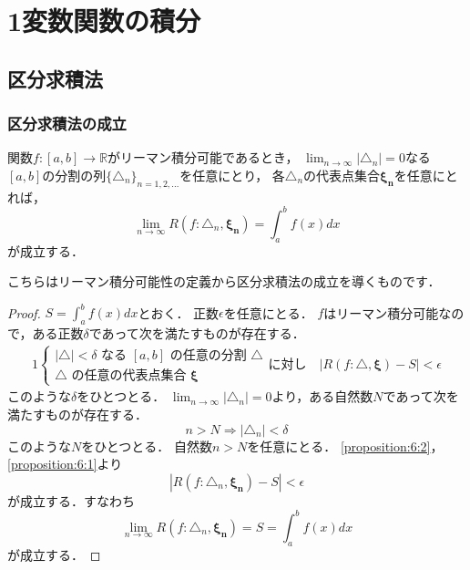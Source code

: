 \documentclass[./index]{subfiles}
\begin{document}
\section{1変数関数の積分}
\setcounter{subsection}{1}
\subsection{区分求積法}
\subsubsection{区分求積法の成立}
\begin{screen}
    \begin{proposition}
        \label{proposition:sectional}
        関数$f:[a,b] \rightarrow \mathbb{R}$がリーマン積分可能であるとき，
        $\lim_{n\rightarrow\infty} |\triangle_n| = 0$なる
        $[a, b]$の分割の列$\{\triangle_n\}_{n=1,2,\dots}$を任意にとり，
        各$\triangle_n$の代表点集合$\mathbf{\xi_n}$を任意にとれば，
        \begin{equation}
            \lim_{n\rightarrow\infty} R(f: \triangle_n, \mathbf{\xi_n})
            =
            \int_a^b f(x) dx
        \end{equation}
        が成立する．
    \end{proposition}
\end{screen}

こちらはリーマン積分可能性の定義から区分求積法の成立を導くものです．

\begin{proof}
    $S = \int_a^b f(x) dx$とおく．
    正数$\epsilon$を任意にとる．
    $f$はリーマン積分可能なので，ある正数$\delta$であって次を満たすものが存在する．
    \begin{alignat}{1}
        \begin{cases}
            |\triangle| < \delta \mbox{ なる } [a, b] \mbox{ の任意の分割 } \triangle \\
            \triangle \mbox{ の任意の代表点集合 } \mathbf{\xi}
        \end{cases}
        \mbox{に対し} \quad
        |R(f: \triangle, \mathbf{\xi}) - S| < \epsilon
        \label{proposition:6:1}
    \end{alignat}
    このような$\delta$をひとつとる．
    $\lim_{n\rightarrow\infty} |\triangle_n| = 0$より，ある自然数$N$であって次を満たすものが存在する．
    \begin{equation}
        n > N \Longrightarrow |\triangle_n| < \delta
        \label{proposition:6:2}
    \end{equation}
    このような$N$をひとつとる．
    自然数$n > N$を任意にとる．
    \cref{proposition:6:2}，\cref{proposition:6:1}より
    \begin{equation}
        |R(f: \triangle_n, \mathbf{\xi_n}) - S| < \epsilon
    \end{equation}
    が成立する．すなわち
    \begin{equation}
        \lim_{n\rightarrow\infty} R(f: \triangle_n, \mathbf{\xi_n})
        =
        S
        =
        \int_a^b f(x) dx
    \end{equation}
    が成立する．
\end{proof}
\end{document}
